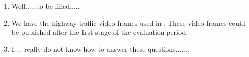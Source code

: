 \begin{enumerate}[i]
\item Well......to be filled.....
\item We have the highway traffic video frames used in \cite{friedman1997image}. These video frames could be published after the first stage of the evaluation period.
\item I.... really do not know how to answer these questions.......
\end{enumerate}